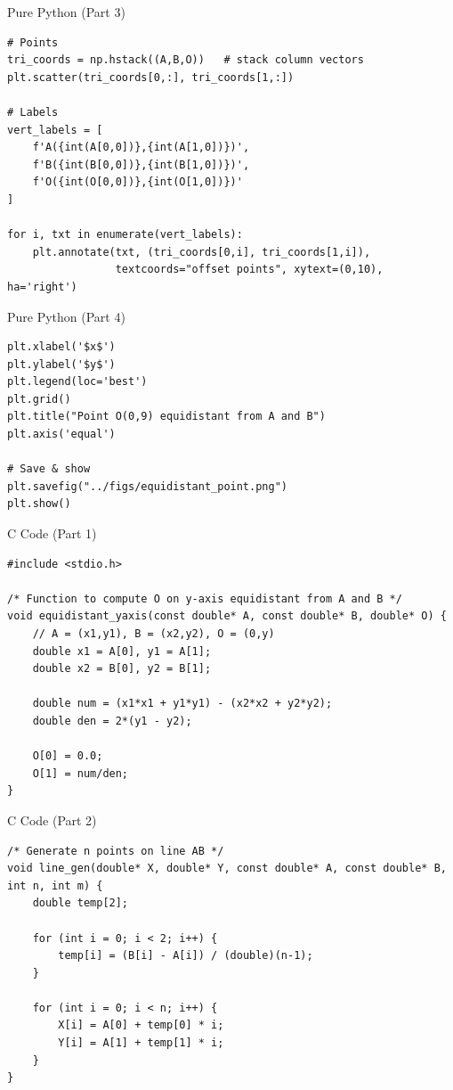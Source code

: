 \documentclass{beamer}
\begin{document}
\begin{frame}[fragile]{Pure Python (Part 3)}
\begin{lstlisting}
# Points
tri_coords = np.hstack((A,B,O))   # stack column vectors
plt.scatter(tri_coords[0,:], tri_coords[1,:])

# Labels
vert_labels = [
    f'A({int(A[0,0])},{int(A[1,0])})',
    f'B({int(B[0,0])},{int(B[1,0])})',
    f'O({int(O[0,0])},{int(O[1,0])})'
]

for i, txt in enumerate(vert_labels):
    plt.annotate(txt, (tri_coords[0,i], tri_coords[1,i]),
                 textcoords="offset points", xytext=(0,10), ha='right')
\end{lstlisting}
\end{frame}

\begin{frame}[fragile]{Pure Python (Part 4)}
\begin{lstlisting}
plt.xlabel('$x$')
plt.ylabel('$y$')
plt.legend(loc='best')
plt.grid()
plt.title("Point O(0,9) equidistant from A and B")
plt.axis('equal')

# Save & show
plt.savefig("../figs/equidistant_point.png")
plt.show()
\end{lstlisting}
\end{frame}
\begin{frame}[fragile]{C Code (Part 1)}
\begin{lstlisting}
#include <stdio.h>

/* Function to compute O on y-axis equidistant from A and B */
void equidistant_yaxis(const double* A, const double* B, double* O) {
    // A = (x1,y1), B = (x2,y2), O = (0,y)
    double x1 = A[0], y1 = A[1];
    double x2 = B[0], y2 = B[1];

    double num = (x1*x1 + y1*y1) - (x2*x2 + y2*y2);
    double den = 2*(y1 - y2);

    O[0] = 0.0;
    O[1] = num/den;
}
\end{lstlisting}
\end{frame}

\begin{frame}[fragile]{C Code (Part 2)}
\begin{lstlisting}
/* Generate n points on line AB */
void line_gen(double* X, double* Y, const double* A, const double* B, int n, int m) {
    double temp[2];

    for (int i = 0; i < 2; i++) {
        temp[i] = (B[i] - A[i]) / (double)(n-1);
    }

    for (int i = 0; i < n; i++) {
        X[i] = A[0] + temp[0] * i;
        Y[i] = A[1] + temp[1] * i;
    }
}
\end{lstlisting}
\end{frame}
\end{document}
